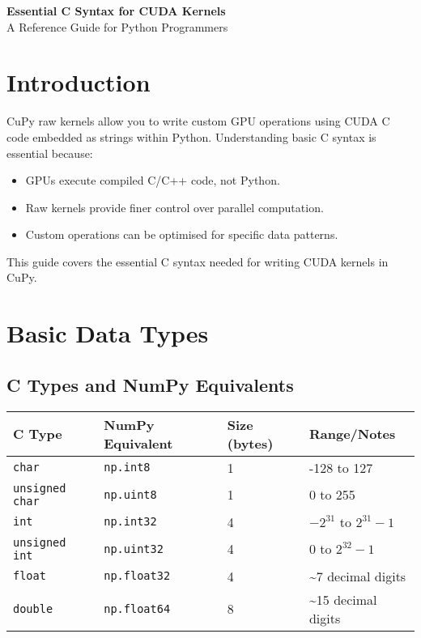 \documentclass[11pt, a4paper]{article}
\newcommand{\code}[1]{\texttt{#1}}
\begin{document}
\begin{center}
    {\LARGE\textbf{Essential C Syntax for CUDA Kernels}}\\[0.5em]
    {\large A Reference Guide for Python Programmers}
\end{center}

\vspace{1em}

\section*{Introduction}

CuPy raw kernels allow you to write custom GPU operations using CUDA C code
embedded as strings within Python. Understanding basic C syntax is essential
because:

\begin{itemize}
    \item GPUs execute compiled C/C++ code, not Python.
    \item Raw kernels provide finer control over parallel computation.
    \item Custom operations can be optimised for specific data patterns.
\end{itemize}

This guide covers the essential C syntax needed for writing CUDA kernels in
CuPy.

\section*{Basic Data Types}

\subsection*{C Types and NumPy Equivalents}

\begin{center}
\begin{tabular}{llll}
\toprule
C Type & NumPy Equivalent & Size (bytes) & Range/Notes \\
\midrule
\code{char} & \code{np.int8} & 1 & -128 to 127 \\
\code{unsigned char} & \code{np.uint8} & 1 & 0 to 255 \\
\code{int} & \code{np.int32} & 4 & $-2^{31}$ to $2^{31}-1$ \\
\code{unsigned int} & \code{np.uint32} & 4 & 0 to $2^{32}-1$ \\
\code{float} & \code{np.float32} & 4 & \textasciitilde{}7 decimal digits \\
\code{double} & \code{np.float64} & 8 & \textasciitilde{}15 decimal digits \\
\bottomrule
\end{tabular}
\end{center}
\end{document}
